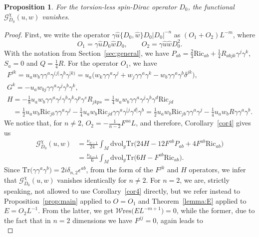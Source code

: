 \documentclass[10pt,a4paper]{amsart}
\numberwithin{equation}{section}
\newtheorem{Proposition}[Theorem]{Proposition}
\theoremstyle{definition}
\def\W{\mathscr{W} \mathrm{res}}
\def\Tr{\mathrm{Tr}}
\def\dv{\mathrm{dvol}_g}
\begin{document}
\begin{Proposition}
	For the torsion-less spin-Dirac operator $D_0$, the functional $\mathscr{G}_{D_0}^\chi(u,w)$ vanishes.
\end{Proposition}
\begin{proof}
	First, we write the operator $\gamma\hat{u}\{D_0,\hat{w}\}D_0|D_0|^{-n}$ as $(O_1+O_2)L^{-m}$, where
	\[
		O_1=\gamma\hat{u}D_0\hat{w} D_0, \qquad O_2=\gamma \hat{u}\hat{w}D_0^{2}.
	\]
	With the notation from Section~\ref{sec:general}, we have $P_{ab}=\frac{2}{3}\mathrm{Ric}_{ab}+\frac{1}{4}R_{abjk}\gamma^j\gamma^k$, $S_a=0$ and $Q=\frac{1}{4}R$. For the operator $O_1$, we have
	\begin{gather*}
			F^{jk}=u_a w_b \gamma \gamma^a \gamma^{(j|} \gamma^b \gamma^{|k)}= u_a\bigl(w_k\gamma \gamma^a \gamma^j +w_j\gamma\gamma^a\gamma^k -w_b \gamma\gamma^a\gamma^b \delta^{jk}\bigr),\\
			G^k=-u_aw_{bj}\gamma \gamma^a \gamma^j \gamma^b \gamma^k,\\
			H=-\frac{1}{8}u_a w_b \gamma \gamma^a \gamma^j \gamma^b \gamma^k \gamma^p\gamma^s R_{jkps}=\frac{1}{4}u_aw_b \gamma\gamma^a \gamma^j \gamma^b\gamma^d \mathrm{Ric}_{jd}\\
		\phantom{H}{}	=\frac{1}{2}u_aw_b \mathrm{Ric}_{jb}\gamma\gamma^a\gamma^j -\frac{1}{4}u_aw_b \mathrm{Ric}_{jd}\gamma\gamma^a \gamma^{[j}\gamma^{d]}\gamma^b	=\frac{1}{2}u_aw_b \mathrm{Ric}_{jb}\gamma\gamma^a\gamma^j -\frac{1}{4}u_a w_b R \gamma\gamma^a \gamma^b.
		\end{gather*}
	We notice that, for $n\neq 2$, $O_2=-\frac{1}{n-2}F^{aa} L$, and therefore, Corollary~\ref{cor4} gives us
	\begin{align*}
			\mathscr{G}_{D_0}^\chi(u,w)&=\frac{\nu_{n-1}}{24}\int_M\dv \Tr \bigl(24H -12F^{ab}P_{ab}+4F^{ab}\mathrm{Ric}_{ab}\bigr)\\
			&=\frac{\nu_{n-1}}{6}\int_M\dv \Tr\bigl(6H -F^{ab}\mathrm{Ric}_{ab}\bigr).
		\end{align*}
	Since $\Tr\bigl(\gamma\gamma^a\gamma^b\bigr)=2i\delta_{n,2}\epsilon^{ab}$, from the form of the $F^{jk}$ and $H$ operators, we infer that $\mathscr{G}_{D_0}^\chi(u,w)$ vanishes identically for $n\neq 2$. For $n=2$, we are, strictly speaking, not allowed to use Corollary~\ref{cor4} directly, but we refer instead to Proposition~\ref{prop:main} applied to $O=O_1$ and Theorem~\ref{lemma:E} applied to $E=O_2 L^{-1}$. From the latter, we get $\W\bigl(EL^{-m+1}\bigr)=0$, while the former, due to the fact that in $n=2$ dimensions we have $F^{jj}=0$, again leads to
	\[
\]
\end{proof}
\end{document}
